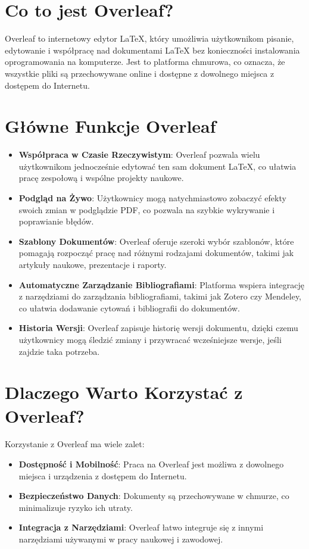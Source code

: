 \section{Co to jest Overleaf?}
\label{sec:overleaf}

Overleaf to internetowy edytor LaTeX, który umożliwia użytkownikom pisanie, edytowanie i współpracę nad dokumentami LaTeX bez konieczności instalowania oprogramowania na komputerze. Jest to platforma chmurowa, co oznacza, że wszystkie pliki są przechowywane online i dostępne z dowolnego miejsca z dostępem do Internetu.

\section{Główne Funkcje Overleaf}

\begin{itemize}
    \item \textbf{Współpraca w Czasie Rzeczywistym}: Overleaf pozwala wielu użytkownikom jednocześnie edytować ten sam dokument LaTeX, co ułatwia pracę zespołową i wspólne projekty naukowe.
    \item \textbf{Podgląd na Żywo}: Użytkownicy mogą natychmiastowo zobaczyć efekty swoich zmian w podglądzie PDF, co pozwala na szybkie wykrywanie i poprawianie błędów.
    \item \textbf{Szablony Dokumentów}: Overleaf oferuje szeroki wybór szablonów, które pomagają rozpocząć pracę nad różnymi rodzajami dokumentów, takimi jak artykuły naukowe, prezentacje i raporty.
    \item \textbf{Automatyczne Zarządzanie Bibliografiami}: Platforma wspiera integrację z narzędziami do zarządzania bibliografiami, takimi jak Zotero czy Mendeley, co ułatwia dodawanie cytowań i bibliografii do dokumentów.
    \item \textbf{Historia Wersji}: Overleaf zapisuje historię wersji dokumentu, dzięki czemu użytkownicy mogą śledzić zmiany i przywracać wcześniejsze wersje, jeśli zajdzie taka potrzeba.
\end{itemize}

\section{Dlaczego Warto Korzystać z Overleaf?}

Korzystanie z Overleaf ma wiele zalet:
\begin{itemize}
    \item \textbf{Dostępność i Mobilność}: Praca na Overleaf jest możliwa z dowolnego miejsca i urządzenia z dostępem do Internetu.
    \item \textbf{Bezpieczeństwo Danych}: Dokumenty są przechowywane w chmurze, co minimalizuje ryzyko ich utraty.
    \item \textbf{Integracja z Narzędziami}: Overleaf łatwo integruje się z innymi narzędziami używanymi w pracy naukowej i zawodowej.
\end{itemize}
